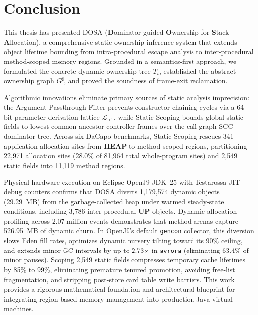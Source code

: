 \documentclass[12pt,a4paper]{article}
\newcommand{\UP}{\textbf{UP}}
\newcommand{\HEAP}{\textbf{HEAP}}
\begin{document}
\section{Conclusion}
\label{sec:conclusion}

This thesis has presented DOSA (\textbf{D}ominator-guided \textbf{O}wnership for \textbf{S}tack \textbf{A}llocation), a comprehensive static ownership inference system that extends object lifetime bounding from intra-procedural escape analysis to inter-procedural method-scoped memory regions. Grounded in a semantics-first approach, we formulated the concrete dynamic ownership tree $T_t$, established the abstract ownership graph $G^\sharp$, and proved the soundness of frame-exit reclamation.

Algorithmic innovations eliminate primary sources of static analysis imprecision: the Argument-Passthrough Filter prevents constructor chaining cycles via a 64-bit parameter derivation lattice $\mathcal{L}_{\text{ret}}$, while Static Scoping bounds global static fields to lowest common ancestor controller frames over the call graph SCC dominator tree. Across six DaCapo benchmarks, Static Scoping rescues 341 application allocation sites from \HEAP{} to method-scoped regions, partitioning 22{,}971 allocation sites (28.0\% of 81{,}964 total whole-program sites) and 2{,}549 static fields into 11{,}119 method regions.

Physical hardware execution on Eclipse OpenJ9 JDK~25 with Testarossa JIT debug counters confirms that DOSA diverts 1{,}179{,}574 dynamic objects (29.29~MB) from the garbage-collected heap under warmed steady-state conditions, including 3{,}786 inter-procedural \UP{} objects. Dynamic allocation profiling across 2.07 million events demonstrates that method arenas capture 526.95~MB of dynamic churn. In OpenJ9's default \texttt{gencon} collector, this diversion slows Eden fill rates, optimizes dynamic nursery tilting toward its 90\% ceiling, and extends minor GC intervals by up to 2.73$\times$ in \texttt{avrora} (eliminating 63.4\% of minor pauses). Scoping 2{,}549 static fields compresses temporary cache lifetimes by 85\% to 99\%, eliminating premature tenured promotion, avoiding free-list fragmentation, and stripping post-store card table write barriers. This work provides a rigorous mathematical foundation and architectural blueprint for integrating region-based memory management into production Java virtual machines.
\end{document}
